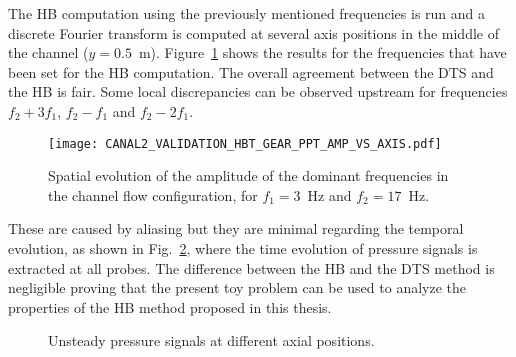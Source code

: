 The HB computation using the previously mentioned frequencies is
run and a discrete Fourier transform is computed at several axis positions
in the middle of the channel ($y=0.5$~m). Figure~\ref{fig:canal2_validation_hbt_gear_amp_vs_axis}
shows the results for the frequencies that have been set for the HB computation.
The overall agreement between the DTS and the HB is fair.  
Some local discrepancies can be
observed upstream for frequencies $f_2 + 3f_1$, $f_2 - f_1$ and $f_2 -
2f_1$. 
\begin{figure}[htb]
  \centering
  \texttt{[image: CANAL2\_VALIDATION\_HBT\_GEAR\_PPT\_AMP\_VS\_AXIS.pdf]}
  \caption{Spatial evolution of the amplitude of the dominant
    frequencies in the channel flow configuration, for $f_1 = 3$~Hz and $f_2 = 17$~Hz.}
  \label{fig:canal2_validation_hbt_gear_amp_vs_axis}
\end{figure}
These are caused by aliasing
but they are minimal regarding the temporal evolution, as
shown in Fig.~\ref{fig:canal2_validation_hbt_gear_time_ev}, where the
time evolution of pressure signals is extracted at all probes.  The
difference between the HB and the DTS method is negligible proving
that the present toy problem can be used to analyze the properties of 
the HB method proposed in this thesis.
\begin{figure}[htb]
  \centering 
   \quad{}
  \caption{Unsteady pressure signals at different axial positions.}
  \label{fig:canal2_validation_hbt_gear_time_ev}
\end{figure}

\FloatBarrier